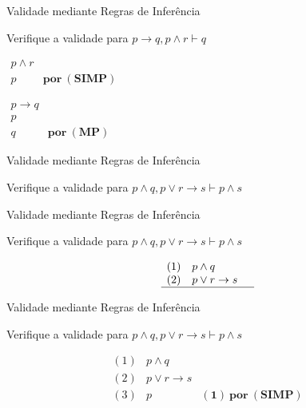 \begin{frame}[t]{Validade mediante Regras de Inferência}

	Verifique a validade para $p \rightarrow q, p \wedge r \vdash q$
	
	\vskip 1.5cm
	
	\begin{minipage}{0.5\textwidth}
	$	\begin{array}{ll}
	p \wedge r  & \\
	\hline
	p & \mathbf{por~(SIMP)}
	\end{array}$
	\end{minipage}
	\begin{minipage}{0.3\textwidth}
	$	\begin{array}{ll}
	p \rightarrow q & \\
	p &  \\
	\hline
	q & \mathbf{por~(MP)}
	\end{array}$
	\end{minipage}
\end{frame}

\begin{frame}[t]{Validade mediante Regras de Inferência}

	Verifique a validade para $p \wedge q, p \vee r \rightarrow s \vdash p \wedge s$
	
\end{frame}

\begin{frame}[t]{Validade mediante Regras de Inferência}

	Verifique a validade para $p \wedge q, p \vee r \rightarrow s \vdash p \wedge s$
	
	\vskip 1.5cm
	
	$$\begin{array}{lll}
	(1) & p \wedge q  & \\
	(2) & p \vee r \rightarrow s & \\
	\hline
	\end{array}$$	
\end{frame}

\begin{frame}[t]{Validade mediante Regras de Inferência}

	Verifique a validade para $p \wedge q, p \vee r \rightarrow s \vdash p \wedge s$
	
	\vskip 1.5cm
	
	$$\begin{array}{lll}
	(1) & p \wedge q  & \\
	(2) & p \vee r \rightarrow s & \\
	\hline
	(3) & p & \mathbf{(1)~por~(SIMP)} \\
	\end{array}$$	
\end{frame}

